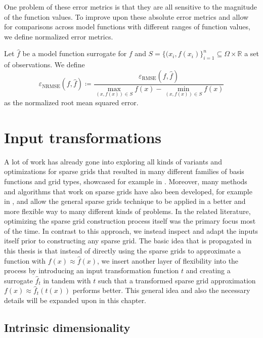 \documentclass[
  a4paper,  %
  twoside,  %
  bibliography=totoc,
  headsepline,
  cleardoublepage=empty,
  parskip=half,
  draft=false
]{scrbook}
\begin{document}
One problem of these error metrics is that they are all sensitive to the magnitude of the function values.
To improve upon these absolute error metrics and allow for comparisons across model functions with different ranges of function values, we define normalized error metrics.

\begin{definition}
Let $\hat{f}$ be a model function surrogate for $f$ and $S=\{(x_i, f(x_i)\}_{i=1}^n \subseteq \Omega \times \mathds{R}$ a set of observations.
We define
\begin{equation}
\varepsilon_{\mathrm{NRMSE}}(f, \hat{f}) \coloneqq \frac{\varepsilon_{\mathrm{RMSE}}(f, \hat{f})}{\max\limits_{(x, f(x)) \in S} f(x) - \min\limits_{(x, f(x)) \in S} f(x)}
\end{equation}
as the normalized root mean squared error.
\end{definition}


\chapter{Input transformations}
\label{chap:c3}

A lot of work has already gone into exploring all kinds of variants and optimizations for sparse grids that resulted in many different families of basis functions and grid types, showcased for example in \cite{Feuersaenger2010, Valentin2019}.
Moreover, many methods and algorithms that work on sparse grids have also been developed, for example in \cite{Gerstner1998, Garcke2001, Pflueger2010, Valentin2019, Rehme2021}, and allow the general sparse grids technique to be applied in a better and more flexible way to many different kinds of problems.
In the related literature, optimizing the sparse grid construction process itself was the primary focus most of the time.
In contrast to this approach, we instead inspect and adapt the inputs itself prior to constructing any sparse grid.
The basic idea that is propagated in this thesis is that instead of directly using the sparse grids to approximate a function with $f(x) \approx \hat{f}(x)$, we insert another layer of flexibility into the process by introducing an input transformation function $t$ and creating a surrogate $\hat{f}_t$ in tandem with $t$ such that a transformed sparse grid approximation $f(x) \approx \hat{f}_t(t(x))$ performs better.
This general idea and also the necessary details will be expanded upon in this chapter.

\section{Intrinsic dimensionality}
\label{sec:intrinsic}
\end{document}
